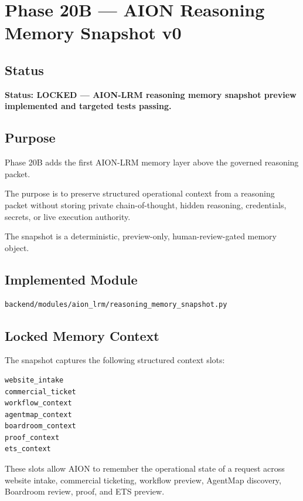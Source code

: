 \section{Phase 20B --- AION Reasoning Memory Snapshot v0}
\label{sec:phase20b-aion-reasoning-memory-snapshot-v0}

\subsection{Status}

\textbf{Status: LOCKED --- AION-LRM reasoning memory snapshot preview implemented and targeted tests passing.}

\subsection{Purpose}

Phase 20B adds the first AION-LRM memory layer above the governed reasoning packet.

The purpose is to preserve structured operational context from a reasoning packet without storing private chain-of-thought, hidden reasoning, credentials, secrets, or live execution authority.

The snapshot is a deterministic, preview-only, human-review-gated memory object.

\subsection{Implemented Module}

\begin{verbatim}
backend/modules/aion_lrm/reasoning_memory_snapshot.py
\end{verbatim}

\subsection{Locked Memory Context}

The snapshot captures the following structured context slots:

\begin{verbatim}
website_intake
commercial_ticket
workflow_context
agentmap_context
boardroom_context
proof_context
ets_context
\end{verbatim}

These slots allow AION to remember the operational state of a request across website intake, commercial ticketing, workflow preview, AgentMap discovery, Boardroom review, proof, and ETS preview.

